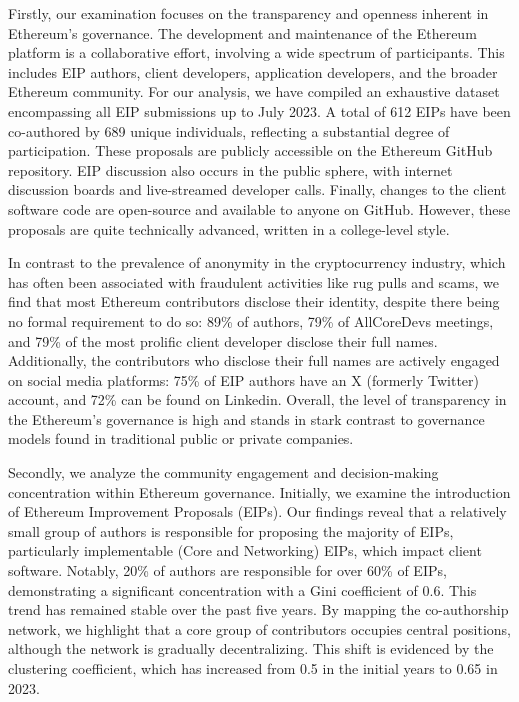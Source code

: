 \documentclass[No]{AEA}
\begin{document}
Firstly, our examination focuses on the transparency and openness inherent in Ethereum's governance. The development and maintenance of the Ethereum platform is a collaborative effort, involving a wide spectrum of participants. This includes EIP authors, client developers, application developers, and the broader Ethereum community. For our analysis, we have compiled an exhaustive dataset encompassing all EIP submissions up to July 2023. A total of 612 EIPs have been co-authored by 689  unique individuals, reflecting a substantial degree of participation. These proposals are publicly accessible on the Ethereum GitHub repository. EIP discussion also occurs in the public sphere, with internet discussion boards and live-streamed developer calls. Finally, changes to the client software code are open-source and available to anyone on GitHub. However, these proposals are quite technically advanced, written in a college-level style. 

In contrast to the prevalence of anonymity in the cryptocurrency industry, which has often been associated with fraudulent activities like rug pulls and scams, we find that most Ethereum contributors disclose their identity, despite there being no formal requirement to do so: 89\% of authors, 79\% of AllCoreDevs meetings, and 79\% of the most prolific client developer disclose their full names. Additionally, the contributors who disclose their full names are actively engaged on social media platforms: 75\% of EIP authors have an X (formerly Twitter) account, and 72\% can be found on Linkedin. Overall, the level of transparency in the Ethereum's governance is high and stands in stark contrast to governance models found in traditional public or private companies.  

Secondly, we analyze the community engagement and decision-making concentration within Ethereum governance. Initially, we examine the introduction of Ethereum Improvement Proposals (EIPs). Our findings reveal that a relatively small group of authors is responsible for proposing the majority of EIPs, particularly implementable (Core and Networking) EIPs, which impact client software. Notably, 20\% of authors are responsible for over 60\% of EIPs, demonstrating a significant concentration with a Gini coefficient of 0.6. This trend has remained stable over the past five years. By mapping the co-authorship network, we highlight that a core group of contributors occupies central positions, although the network is gradually decentralizing. This shift is evidenced by the clustering coefficient, which has increased from 0.5 in the initial years to 0.65 in 2023.
\end{document}
